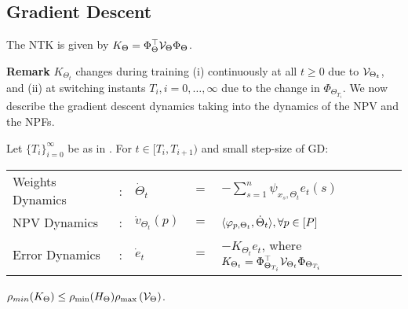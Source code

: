 \subsection{Gradient Descent}
\begin{proposition}\label{prop:ntknew}
The NTK is given by $K_{\Theta}=\Phi^\top_{\Theta}\mathcal{V}_{\Theta}\Phi_{\Theta}$.
\end{proposition}
\textbf{Remark} $K_{\Theta_t}$ changes during training (i) continuously at all $t\geq 0$ due to $\mathcal{V}_{\Theta_t}$, and (ii) at switching instants $T_{i},i=0,\ldots,\infty$ due to the change in $\Phi_{\Theta_{T_i}}$. We now describe the gradient descent dynamics taking into the dynamics of the NPV and the NPFs.
\begin{comment}
\textbf{Remark:} The NTK matrix is given by $K_{\Theta}(s,s')=\ip{\psi_{x_s,\Theta},\psi_{x_{s'},\Theta}}, s, s'\in[n]$ and can be further decomposed as:
\begin{align}\label{eq:kerneldecomp}
K_{\Theta}(s,s')=\underbrace{{\kv(s,s')}}_{\ip{\psiv_{x_s,\Theta},\psiv_{x_{s'},\Theta}}}+\underbrace{\kf(s,s')}_{\ip{\psif_{x_s,\Theta},\psif_{x_{s'},\Theta}}}+\underbrace{\kc(s,s')}_{\ip{\psiv_{x_s,\Theta},\psif_{x_{s'},\Theta}}+\ip{\psif_{x_s,\Theta},\psiv_{x_{s'},\Theta}}}
\end{align}
\end{comment}
\begin{proposition}\label{prop:dnnhard}
Let $\{T_i\}_{i=0}^\infty$ be as in . For $t\in[T_{i},T_{i+1})$ and small step-size of GD:
\FloatBarrier
\begin{table}[h]
\centering
\begin{tabular}{ l c l l l }
Weights Dynamics &:  & $\dot{\Theta}_t$&$=$&$-\sum_{s=1}^n \psi_{x_s,\Theta_t}e_t(s)$\\
NPV Dynamics&: & $\dot{v}_{\Theta_t}(p)$&$=$&$\langle \varphi_{p,\Theta_t},\dot{\Theta}_t\rangle,\forall p\in[P]$\\
Error Dynamics&: & $\dot{e}_t$&$=$&$-K_{\Theta_t}e_t$, where $K_{\Theta_t}=\Phi^\top_{\Theta_{T_i}}\mathcal{V}_{\Theta_t}\Phi_{\Theta_{T_i}}$\\
\end{tabular}
\end{table}
\end{proposition}
\begin{proposition}\label{prop:condition}
 $\rho_{min}(K_{\Theta})\leq \rho_{\min}(H_{\Theta})\rho_{\max}\left(\mathcal{V}_{\Theta}\right)$.
\end{proposition}
